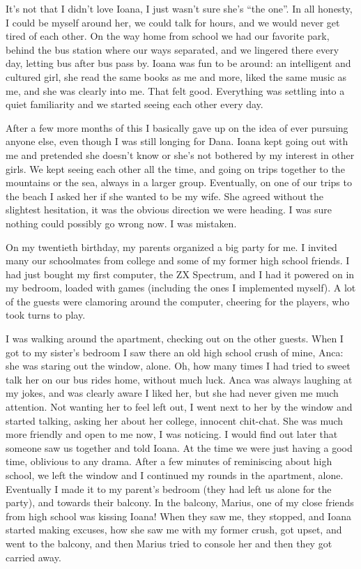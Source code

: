 \documentclass[12pt]{book}
\begin{document}
It's not that I didn't love Ioana, I just wasn't sure she's ``the
one''. In all honesty, I could be myself around her, we could talk for
hours, and we would never get tired of each other. On the way home
from school we had our favorite park, behind the bus station where our
ways separated, and we lingered there every day, letting bus after bus
pass by. Ioana was fun to be around: an intelligent and cultured girl,
she read the same books as me and more, liked the same music as me,
and she was clearly into me. That felt good. Everything was settling
into a quiet familiarity and we started seeing each other every day.

After a few more months of this I basically gave up on the idea of ever
pursuing anyone else, even though I was still longing for Dana. Ioana
kept going out with me and pretended she doesn't know or she's not
bothered by my interest in other girls. We kept seeing each other all
the time, and going on trips together to the mountains or the sea,
always in a larger group. Eventually, on one of our trips to the beach I
asked her if she wanted to be my wife. She agreed without the slightest
hesitation, it was the obvious direction we were heading. I was sure
nothing could possibly go wrong now. I was mistaken.

On my twentieth birthday, my parents organized a big party for me. I
invited many our schoolmates from college and some of my former high
school friends. I had just bought my first computer, the ZX Spectrum,
and I had it powered on in my bedroom, loaded with games (including the
ones I implemented myself). A lot of the guests were clamoring around
the computer, cheering for the players, who took turns to play.

I was walking around the apartment, checking out on the other guests.
When I got to my sister's bedroom I saw there an old high school crush
of mine, Anca: she was staring out the window, alone. Oh, how many times
I had tried to sweet talk her on our bus rides home, without much luck.
Anca was always laughing at my jokes, and was clearly aware I liked her,
but she had never given me much attention. Not wanting her to feel left
out, I went next to her by the window and started talking, asking her
about her college, innocent chit-chat. She was much more friendly and
open to me now, I was noticing. I would find out later that someone saw
us together and told Ioana. At the time we were just having a good time,
oblivious to any drama. After a few minutes of reminiscing about high
school, we left the window and I continued my rounds in the apartment,
alone. Eventually I made it to my parent's bedroom (they had left us
alone for the party), and towards their balcony. In the balcony, Marius,
one of my close friends from high school was kissing Ioana! When they
saw me, they stopped, and Ioana started making excuses, how she saw me
with my former crush, got upset, and went to the balcony, and then
Marius tried to console her and then they got carried away.
\end{document}

